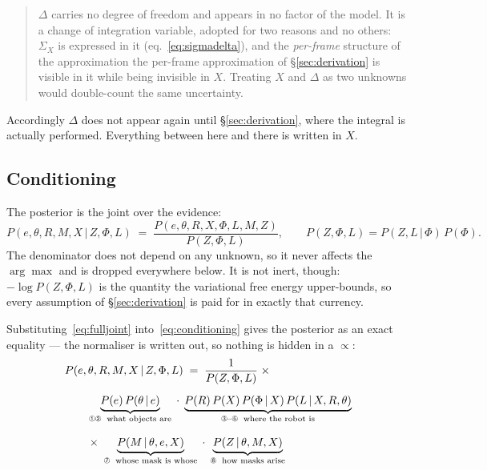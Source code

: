 \documentclass[11pt,a4paper]{report}
\newcommand{\given}{\,|\,}
\theoremstyle{definition}   %
\begin{document}
\begin{quote}
$\Delta$ carries no degree of freedom and appears in no factor of the model. It is a change of
integration variable, adopted for two reasons and no others: $\Sigma_X$ is expressed in it
(eq.~\ref{eq:sigmadelta}), and the \emph{per-frame} structure of the approximation
the per-frame approximation of \S\ref{sec:derivation} is visible in it while being invisible in
$X$. Treating $X$ and $\Delta$ as two
unknowns would double-count the same uncertainty.
\end{quote}

\noindent
Accordingly $\Delta$ does not appear again until \S\ref{sec:derivation}, where the integral is
actually performed. Everything between here and there is written in $X$.

\subsection{Conditioning}

The posterior is the joint over the evidence:
\begin{equation}
P\!\left(e,\theta,R,M,X\given Z,\Phi,L\right)
\;=\;
\frac{P\!\left(e,\theta,R,X,\Phi,L,M,Z\right)}{P(Z,\Phi,L)},
\qquad
P(Z,\Phi,L)=P(Z,L\given\Phi)\,P(\Phi).
\label{eq:conditioning}
\end{equation}
The denominator does not depend on any unknown, so it never affects the $\arg\max$ and is dropped
everywhere below. It is not inert, though: $-\log P(Z,\Phi,L)$ is the quantity the variational free
energy upper-bounds, so every assumption of \S\ref{sec:derivation} is paid for in exactly that
currency.

Substituting~\eqref{eq:fulljoint} into~\eqref{eq:conditioning} gives the posterior as an exact
equality --- the normaliser is written out, so nothing is hidden in a $\propto$:
\begin{align}
&P\!\left(e,\theta,R,M,X\given Z,\Phi,L\right)\;=\;\frac{1}{P(Z,\Phi,L)}\;\times
\nonumber\\[5pt]
&\qquad
\underbrace{P(e)\,P(\theta\given e)}_{\text{\ding{192}\ding{193}\; what objects are}}
\;\cdot\;
\underbrace{P(R)\,P(X)\,P(\Phi\given X)\,P(L\given X,R,\theta)}_{\text{\ding{194}--\ding{197}\; where the robot is}}
\nonumber\\[7pt]
&\qquad\times\;
\underbrace{P(M\given\theta,e,X)}_{\text{\ding{198}\; whose mask is whose}}
\;\cdot\;
\underbrace{P(Z\given\theta,M,X)}_{\text{\ding{199}\; how masks arise}}
\label{eq:posterior-raw}
\end{align}
\end{document}
